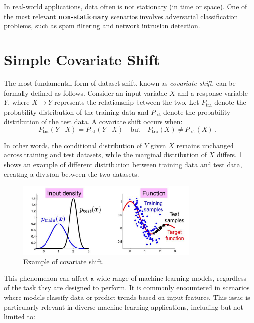 In real-world applications, data often is not stationary (in time or space). One of the most relevant \textbf{non-stationary} scenarios involves adversarial classification problems, such as spam filtering and network intrusion detection.
	

\section{Simple Covariate Shift}

The most fundamental form of dataset shift, known as \textit{covariate shift}, can be formally defined as follows. Consider an input variable \( X \) and a response variable \( Y \), where \( X \to Y \) represents the relationship between the two. Let \( P_{\text{tra}} \) denote the probability distribution of the training data and \( P_{\text{tst}} \) denote the probability distribution of the test data. A covariate shift occurs when:  
\[
P_{\text{tra}}(Y \mid X) = P_{\text{tst}}(Y \mid X) \quad \text{but} \quad P_{\text{tra}}(X) \neq P_{\text{tst}}(X)\,.
\]

In other words, the conditional distribution of \( Y \) given \( X \) remains unchanged across training and test datasets, while the marginal distribution of \( X \) differs. \cref{fig:covariate-shift} shows an example of different distribution between training data and test data, creating a division between the two datasets.  
	
\begin{figure}[H]
	\centering
	\includegraphics[width=0.8\textwidth]{assets/immagine.png} 
	\caption{Example of covariate shift.}
	\label{fig:covariate-shift}
\end{figure}

This phenomenon can affect a wide range of machine learning models, regardless of the task they are designed to perform. It is commonly encountered in scenarios where models classify data or predict trends based on input features. This issue is particularly relevant in diverse machine learning applications, including but not limited to:
	
